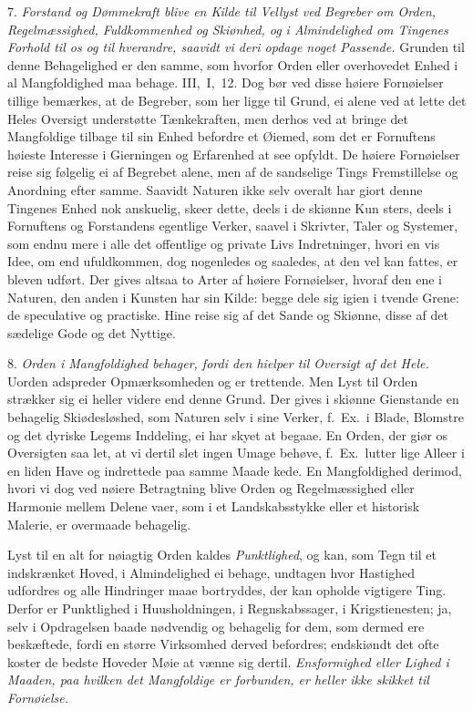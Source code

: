 \documentclass[12pt,a4paper]{article}
\newcommand{\opage}[1]{\marginnote{\footnotesize\textit{[#1]}}}
\begin{document}
7. \emph{Forstand og Dømmekraft blive en Kilde til Vellyst ved Begreber om Orden,
Regelmæssighed, Fuldkommenhed og Skiønhed, og i Almindelighed om Tingenes Forhold til os og
til hverandre, saavidt vi deri opdage noget Passende.} Grunden til denne Behagelighed er
den samme, som hvorfor Orden eller overhovedet Enhed i al Mangfoldighed maa behage.
III,~I,~12. Dog bør ved disse høiere Fornøielser tillige bemærkes, at de Begreber, som her
ligge til Grund, ei alene ved at lette det Heles Oversigt understøtte Tænkekraften, men
derhos ved at bringe det Mangfoldige tilbage til sin Enhed befordre et Øiemed, som det er
Fornuftens høieste Interesse i Gierningen og Erfarenhed at see opfyldt. De høiere
Fornøielser reise sig følgelig ei af Begrebet alene, men af de sandselige Tings
Fremstillelse og Anordning efter samme. Saavidt Naturen ikke selv overalt har giort denne
Tingenes Enhed nok anskuelig, skeer dette, deels i de skiønne Kun%
\opage{244}sters, deels i Fornuftens og Forstandens egentlige Verker, saavel i Skrivter, Taler og
Systemer, som endnu mere i alle det offentlige og private Livs Indretninger, hvori en vis
Idee, om end ufuldkommen, dog nogenledes og saaledes, at den vel kan fattes, er bleven
udført. Der gives altsaa to Arter af høiere Fornøielser, hvoraf den ene i Naturen, den
anden i Kunsten har sin Kilde: begge dele sig igien i tvende Grene: de speculative og
practiske. Hine reise sig af det Sande og Skiønne, disse af det sædelige Gode og det
Nyttige.

8. \emph{Orden i Mangfoldighed behager, fordi den hielper til Oversigt af det Hele.} Uorden
adspreder Opmærksomheden og er trettende. Men Lyst til Orden strækker sig ei heller videre
end denne Grund. Der gives i skiønne Gienstande en behagelig Skiødesløshed, som Naturen
selv i sine Verker, f.~Ex.\ i Blade, Blomstre og det dyriske Legems Inddeling, ei har skyet
at begaae. En Orden, der giør os Oversigten saa let, at vi dertil slet ingen Umage behøve,
f.~Ex.\ lutter lige Alleer i en liden Have og indrettede paa samme Maade kede. En
Mangfoldighed derimod, hvori vi dog ved nøiere Betragtning blive Orden og Regelmæssighed
eller Harmonie mellem Delene vaer, som i et Landskabsstykke eller et historisk Malerie, er
overmaade behagelig.

Lyst til en alt for nøiagtig Orden kaldes \emph{Punktlighed}, og kan, som Tegn til et
indskrænket Hoved,
\opage{245} i Almindelighed ei behage, undtagen hvor Hastighed udfordres og alle Hindringer maae
bortryddes, der kan opholde vigtigere Ting. Derfor er Punktlighed i Huusholdningen, i
Regnskabssager, i Krigstienesten; ja, selv i Opdragelsen baade nødvendig og behagelig for
dem, som dermed ere beskæftede, fordi en større Virksomhed derved befordres; endskiøndt det
ofte koster de bedste Hoveder Møie at vænne sig dertil. \emph{Ensformighed eller Lighed i
Maaden, paa hvilken det Mangfoldige er forbunden, er heller ikke skikket til Fornøielse.}
\end{document}
